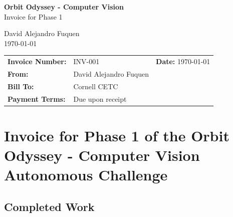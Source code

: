 \documentclass[a4]{article}
\begin{document}
\thispagestyle{fancy}

\begin{center}
    \textbf{\large Orbit Odyssey - Computer Vision} \\
    {Invoice for Phase 1}

    \vspace{0.7em}

    David Alejandro Fuquen \\

    {\small \today}

\end{center}

\vspace{1em}

\noindent
\begin{tabularx}{\textwidth}{@{}lXr@{}}
\textbf{Invoice Number:} & INV-001 & \textbf{Date:} \today \\
\textbf{From:} & David Alejandro Fuquen & \\
\textbf{Bill To:} & Cornell CETC & \\
\textbf{Payment Terms:} & Due upon receipt & \\
\end{tabularx}

\vspace{1em}

\section*{Invoice for Phase 1 of the Orbit Odyssey - Computer Vision Autonomous Challenge}

\subsection*{Completed Work}
\end{document}
